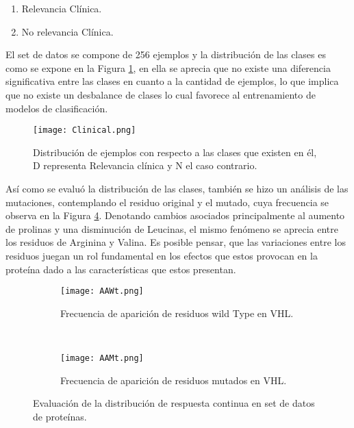 \begin{enumerate}
	
	\item Relevancia  Clínica.
	\item No relevancia Clínica.
\end{enumerate}

El set de datos se compone de 256 ejemplos y la distribución de las clases es como se expone en la Figura \ref{clasesVHL}, en ella se aprecia que no existe una diferencia significativa entre las clases en cuanto a la cantidad de ejemplos, lo que implica que no existe un desbalance de clases lo cual favorece al entrenamiento de modelos de clasificación.

\begin{figure}[!h]
	\centering
	\texttt{[image: Clinical.png]}
	\caption{Distribución de ejemplos con respecto a las clases que existen en él, D representa Relevancia clínica y N el caso contrario.}
	\label{clasesVHL}
\end{figure}

Así como se evaluó la distribución de las clases, también se hizo un análisis de las mutaciones, contemplando el residuo original y el mutado, cuya frecuencia se observa en la Figura \ref{fig:Mutaciones}. Denotando cambios asociados principalmente al aumento de prolinas y una disminución de Leucinas, el mismo fenómeno se aprecia entre los residuos de Arginina y Valina. Es posible pensar, que las variaciones entre los residuos juegan un rol fundamental en los efectos que estos provocan en la proteína dado a las características que estos presentan.  

\begin{figure}[!h]
	\centering
	\begin{subfigure}{0.48\textwidth}
		\texttt{[image: AAWt.png]}
		\caption{Frecuencia de aparición de residuos wild Type en VHL.}
		\label{fig:wild}
	\end{subfigure}
	~ %
	\begin{subfigure}{0.48\textwidth}
		\texttt{[image: AAMt.png]}
		\caption{Frecuencia de aparición de residuos mutados en VHL.}
		\label{fig:mut}
	\end{subfigure}
	
	\caption{Evaluación de la distribución de respuesta continua en set de datos de proteínas.}
	\label{fig:Mutaciones}
\end{figure}

